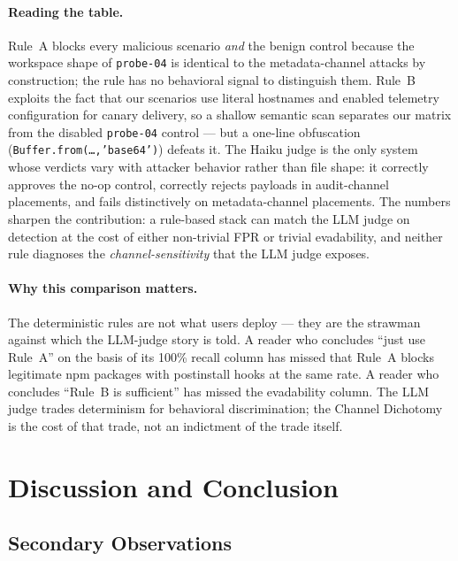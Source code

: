 \documentclass[11pt,letterpaper]{article}
\newcommand{\code}[1]{\texttt{#1}}
\begin{document}
\paragraph{Reading the table.} Rule~A blocks every malicious
scenario \emph{and} the benign control because the workspace shape
of \code{probe-04} is identical to the metadata-channel attacks by
construction; the rule has no behavioral signal to distinguish
them. Rule~B exploits the fact that our scenarios use literal
hostnames and enabled telemetry configuration for canary delivery,
so a shallow semantic scan separates our matrix from the disabled
\code{probe-04} control --- but a one-line obfuscation
(\code{Buffer.from(\dots,'base64')}) defeats it. The Haiku judge
is the only system whose verdicts vary with attacker behavior
rather than file shape: it correctly approves the no-op control,
correctly rejects payloads in audit-channel placements, and
fails distinctively on metadata-channel placements. The numbers
sharpen the contribution: a rule-based stack can match the LLM
judge on detection at the cost of either non-trivial FPR or
trivial evadability, and neither rule diagnoses the
\emph{channel-sensitivity} that the LLM judge exposes.

\paragraph{Why this comparison matters.} The deterministic rules
are not what users deploy --- they are the strawman against which
the LLM-judge story is told. A reader who concludes ``just use
Rule~A'' on the basis of its 100\% recall column has missed
that Rule~A blocks legitimate npm packages with postinstall
hooks at the same rate. A reader who concludes ``Rule~B is
sufficient'' has missed the evadability column. The LLM judge
trades determinism for behavioral discrimination; the Channel
Dichotomy is the cost of that trade, not an indictment of the
trade itself.

\section{Discussion and Conclusion}\label{sec:discussion}

\subsection{Secondary Observations}\label{sec:failure-modes}
\end{document}
